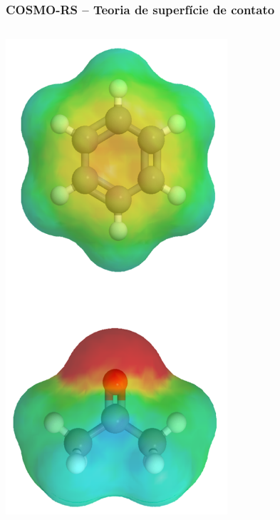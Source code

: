 \documentclass[aspectratio=169]{beamer}
\begin{document}
\begin{frame}
	\frametitle{COSMO-RS -- Teoria de superfície de contato}
	\begin{columns}[c]
			\begin{center}
				\includegraphics[width=0.65\textwidth]{img/contato1}
			\end{center}


\end{columns}
\end{frame}
\end{document}
